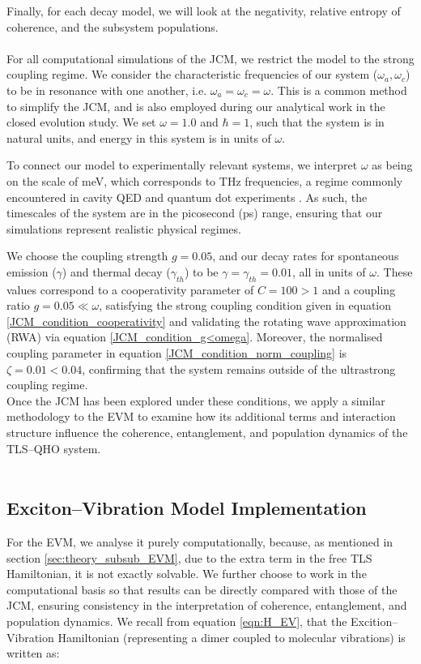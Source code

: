 \documentclass[12pt]{article}
\begin{document}
Finally, for each decay model, we will look at the negativity, relative entropy of coherence, and the subsystem populations.\\
\\
For all computational simulations of the JCM, we restrict the model to the strong coupling regime. We consider the characteristic frequencies of our system ($\omega_a, \omega_c$) to be in resonance with one another, i.e. $\omega_a = \omega_c = \omega$. This is a common method to simplify the JCM, and is also employed during our analytical work in the closed evolution study. We set $\omega = 1.0$ and $\hbar = 1$, such that the system is in natural units, and energy in this system is in units of $\omega$. 

To connect our model to experimentally relevant systems, we interpret $\omega$ as being on the scale of meV, which corresponds to THz frequencies, a regime commonly encountered in cavity QED and quantum dot experiments \cite{General2024-JCM_relevance}. As such, the timescales of the system are in the picosecond (ps) range, ensuring that our simulations represent realistic physical regimes.

We choose the coupling strength $g = 0.05$, and our decay rates for spontaneous emission ($\gamma$) and thermal decay ($\gamma_{\scriptscriptstyle th}$) to be $\gamma = \gamma_{\scriptscriptstyle th} = 0.01$, all in units of $\omega$. These values correspond to a cooperativity parameter of $C = 100 > 1$ and a coupling ratio $g = 0.05 \ll \omega$, satisfying the strong coupling condition given in equation \eqref{JCM_condition_cooperativity} and validating the rotating wave approximation (RWA) via equation \eqref{JCM_condition_g<omega}. Moreover, the normalised coupling parameter in equation \eqref{JCM_condition_norm_coupling} is $\zeta = 0.01 < 0.04$, confirming that the system remains outside of the ultrastrong coupling regime.\\
Once the JCM has been explored under these conditions, we apply a similar methodology to the EVM to examine how its additional terms and interaction structure influence the coherence, entanglement, and population dynamics of the TLS--QHO system. \\
\\
\subsection{Exciton--Vibration Model Implementation} \label{sec:method_sub_EVM}
For the EVM, we analyse it purely computationally, because, as mentioned in section \ref{sec:theory_subsub_EVM}, due to the extra term in the free TLS Hamiltonian, it is not exactly solvable. We further choose to work in the computational basis so that results can be directly compared with those of the JCM, ensuring consistency in the interpretation of coherence, entanglement, and population dynamics. We recall from equation \eqref{eqn:H_EV}, that the Excition--Vibration Hamiltonian (representing a dimer coupled to molecular vibrations) is written as:
\end{document}
